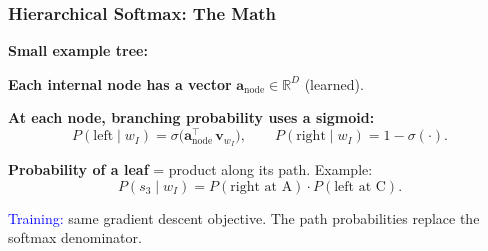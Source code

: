 \documentclass[notes,11pt, aspectratio=169]{beamer}
\newcommand{\va}{\mathbf{a}}
\newcommand{\vv}{\mathbf{v}}
\newcommand{\R}{\mathbb{R}}
\begin{document}
\begin{frame}
\frametitle{Hierarchical Softmax: The Math}

\textbf{Small example tree:}

\vspace{2pt}
\begin{center}
\end{center}

\textbf{Each internal node has a vector} $\va_\text{node} \in \R^D$ (learned).

\vspace{4pt}
\textbf{At each node, branching probability uses a sigmoid:}
\[
    P(\text{left} \mid w_I) = \sigma\!\bigl(\va_\text{node}^\top\, \vv_{w_I}\bigr),
    \qquad
    P(\text{right} \mid w_I) = 1 - \sigma(\cdot).
\]

\textbf{Probability of a leaf} = product along its path. Example:
\[
    P(s_3 \mid w_I) = P(\text{right at A}) \cdot P(\text{left at C}).
\]

\vspace{4pt}
\textcolor{blue}{Training:} same gradient descent objective. The path probabilities replace the softmax denominator.
\end{frame}
\end{document}
